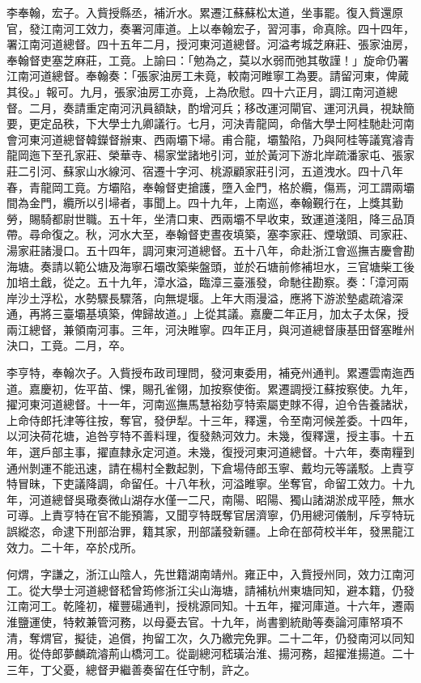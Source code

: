 \begin{pinyinscope}
李奉翰，宏子。入貲授縣丞，補沂水。累遷江蘇蘇松太道，坐事罷。復入貲還原官，發江南河工效力，奏署河庫道。上以奉翰宏子，習河事，命真除。四十四年，署江南河道總督。四十五年二月，授河東河道總督。河溢考城芝麻莊、張家油房，奉翰督吏塞芝麻莊，工竟。上諭曰：「勉為之，莫以水弱而弛其敬謹！」旋命仍署江南河道總督。奉翰奏：「張家油房工未竟，較南河睢寧工為要。請留河東，俾蕆其役。」報可。九月，張家油房工亦竟，上為欣慰。四十六正月，調江南河道總督。二月，奏請重定南河汛員額缺，酌增河兵；移改運河閘官、運河汛員，視缺簡要，更定品秩，下大學士九卿議行。七月，河決青龍岡，命偕大學士阿桂馳赴河南會河東河道總督韓鑅督辦東、西兩壩下埽。甫合龍，壩蟄陷，乃與阿桂等議寬濬青龍岡迤下至孔家莊、榮華寺、楊家堂諸地引河，並於黃河下游北岸疏潘家屯、張家莊二引河、蘇家山水線河、宿遷十字河、桃源顧家莊引河，五道洩水。四十八年春，青龍岡工竟。方壩陷，奉翰督吏搶護，墮入金門，格於纜，傷焉，河工謂兩壩間為金門，纜所以引埽者，事聞上。四十九年，上南巡，奉翰覲行在，上獎其勤勞，賜騎都尉世職。五十年，坐清口東、西兩壩不早收束，致運道淺阻，降三品頂帶。尋命復之。秋，河水大至，奉翰督吏晝夜填築，塞李家莊、煙墩頭、司家莊、湯家莊諸漫口。五十四年，調河東河道總督。五十八年，命赴浙江會巡撫吉慶會勘海塘。奏請以範公塘及海寧石壩改築柴盤頭，並於石塘前修補坦水，三官塘柴工後加培土戧，從之。五十九年，漳水溢，臨漳三臺漲發，命馳往勘察。奏：「漳河兩岸沙土浮松，水勢驟長驟落，向無堤堰。上年大雨漫溢，應將下游淤墊處疏濬深通，再將三臺壩基填築，俾歸故道。」上從其議。嘉慶二年正月，加太子太保，授兩江總督，兼領南河事。三年，河決睢寧。四年正月，與河道總督康基田督塞睢州決口，工竟。二月，卒。

李亨特，奉翰次子。入貲授布政司理問，發河東委用，補兗州通判。累遷雲南迤西道。嘉慶初，佐平苗、惈，賜孔雀翎，加按察使銜。累遷調授江蘇按察使。九年，擢河東河道總督。十一年，河南巡撫馬慧裕劾亨特索屬吏賕不得，迫令告養諸狀，上命侍郎托津等往按，奪官，發伊犁。十三年，釋還，令至南河候差委。十四年，以河決荷花塘，追咎亨特不善料理，復發熱河效力。未幾，復釋還，授主事。十五年，選戶部主事，擢直隸永定河道。未幾，復授河東河道總督。十六年，奏南糧到通州剝運不能迅速，請在楊村全數起剝，下倉場侍郎玉寧、戴均元等議駁。上責亨特冒昧，下吏議降調，命留任。十八年秋，河溢睢寧。坐奪官，命留工效力。十九年，河道總督吳璥奏微山湖存水僅一二尺，南陽、昭陽、獨山諸湖淤成平陸，無水可導。上責亨特在官不能預籌，又聞亨特既奪官居濟寧，仍用總河儀制，斥亨特玩誤縱恣，命逮下刑部治罪，籍其家，刑部議發新疆。上命在部荷校半年，發黑龍江效力。二十年，卒於戍所。

何煟，字謙之，浙江山陰人，先世籍湖南靖州。雍正中，入貲授州同，效力江南河工。從大學士河道總督嵇曾筠修浙江尖山海塘，請補杭州東塘同知，避本籍，仍發江南河工。乾隆初，權豐碭通判，授桃源同知。十五年，擢河庫道。十六年，遷兩淮鹽運使，特敕兼管河務，以母憂去官。十九年，尚書劉統勛等奏論河庫帑項不清，奪煟官，擬徒，追償，拘留工次，久乃繳完免罪。二十二年，仍發南河以同知用。從侍郎夢麟疏濬荊山橋河工。從副總河嵇璜治淮、揚河務，超擢淮揚道。二十三年，丁父憂，總督尹繼善奏留在任守制，許之。


\end{pinyinscope}
